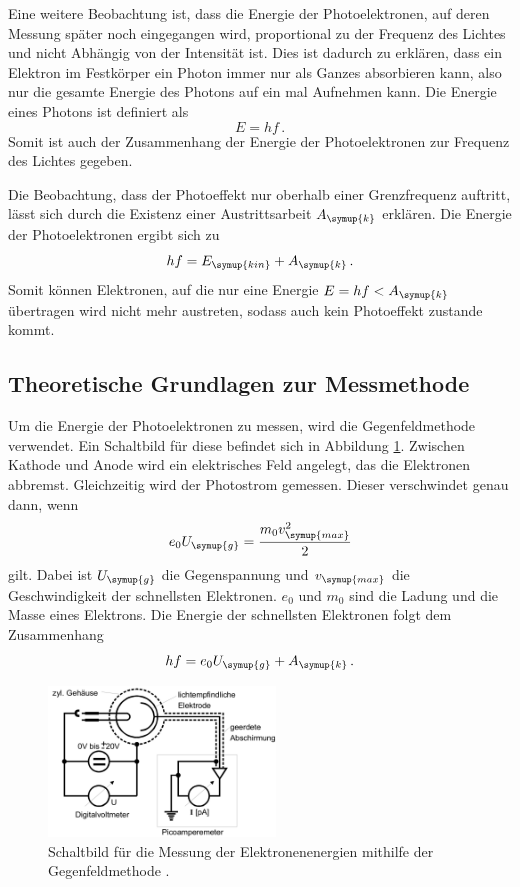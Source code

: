 Eine weitere Beobachtung ist, dass die Energie der Photoelektronen, auf deren Messung später noch
eingegangen wird, proportional zu der Frequenz des Lichtes und nicht Abhängig von der
Intensität ist. Dies ist dadurch zu erklären, dass ein Elektron im Festkörper ein Photon
immer nur als Ganzes absorbieren kann, also nur die gesamte Energie des Photons auf ein mal
Aufnehmen kann. Die Energie eines Photons ist definiert als
\begin{equation}
  E=h f \,.
\end{equation}
Somit ist auch der Zusammenhang der Energie der Photoelektronen zur Frequenz des Lichtes gegeben.

Die Beobachtung, dass der Photoeffekt nur oberhalb einer Grenzfrequenz auftritt, lässt sich
durch die Existenz einer Austrittsarbeit $A_{\symup{k}}$ erklären. Die Energie der
Photoelektronen ergibt sich zu
\begin{equation}
  h f= E_{\symup{kin}}+A_{\symup{k}} \,.
\end{equation}
Somit können Elektronen, auf die nur eine Energie $E=hf<A_{\symup{k}}$ übertragen wird
nicht mehr austreten, sodass auch kein Photoeffekt zustande kommt.

\subsection{Theoretische Grundlagen zur Messmethode}
\label{subsec:Theorie_Messung}

Um die Energie der Photoelektronen zu messen, wird die Gegenfeldmethode verwendet. Ein
Schaltbild für diese befindet sich in Abbildung \ref{fig:schaltbild}. Zwischen
Kathode und Anode wird ein elektrisches Feld angelegt, das die Elektronen abbremst.
Gleichzeitig wird der Photostrom gemessen. Dieser verschwindet genau dann, wenn
\begin{equation}
  e_0 U_{\symup{g}}=\frac{m_0 v_{\symup{max}}^2}{2}
\end{equation}
gilt. Dabei ist $U_{\symup{g}}$ die Gegenspannung und $v_{\symup{max}}$ die
Geschwindigkeit der schnellsten Elektronen. $e_0$ und $m_0$ sind die Ladung und die
Masse eines Elektrons. Die Energie der schnellsten Elektronen folgt dem Zusammenhang
\begin{equation}
  h f=e_0 U_{\symup{g}} + A_{\symup{k}} \,.
  \label{eqn:hfeUA}
\end{equation}

\begin{figure}
  \centering
  \includegraphics[height=4cm]{data/schaltbild.png}
  \caption{Schaltbild für die Messung der Elektronenenergien mithilfe der Gegenfeldmethode \cite{Versuchsanleitung}.}
  \label{fig:schaltbild}
\end{figure}

